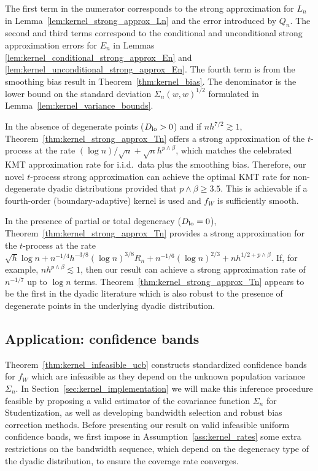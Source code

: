 \documentclass[11pt,lof]{puthesis}
\newcommand{\Dl}{\ensuremath{D_{\textup{lo}}}}
\theoremstyle{break}
\theoremstyle{proof}
\begin{document}
The first term in the numerator corresponds to the strong approximation for
$L_n$ in Lemma~\ref{lem:kernel_strong_approx_Ln} and the error introduced by
$Q_n$.
The second and third terms correspond to the conditional and unconditional
strong approximation errors for $E_n$ in Lemmas
\ref{lem:kernel_conditional_strong_approx_En} and
\ref{lem:kernel_unconditional_strong_approx_En}.
The fourth term is from
the smoothing bias result in Theorem~\ref{thm:kernel_bias}. The denominator is
the lower bound on the standard deviation $\Sigma_n(w,w)^{1/2}$ formulated in
Lemma~\ref{lem:kernel_variance_bounds}.

In the absence of degenerate points ($\Dl > 0$) and if $n h^{7/2}\gtrsim 1$,
Theorem~\ref{thm:kernel_strong_approx_Tn} offers a strong approximation of the
$t$-process at the rate $(\log n)/\sqrt{n}+\sqrt{n}h^{p\wedge\beta}$, which
matches the celebrated KMT approximation rate for i.i.d.\ data plus the
smoothing bias. Therefore, our novel $t$-process strong approximation can
achieve the optimal KMT rate for non-degenerate dyadic distributions provided
that $p\wedge\beta \geq 3.5$. This is achievable if a fourth-order
(boundary-adaptive) kernel is used and $f_W$ is sufficiently smooth.

In the presence of partial or total degeneracy ($\Dl =0$),
Theorem~\ref{thm:kernel_strong_approx_Tn} provides a strong approximation for
the $t$-process at the rate $\sqrt{h}\log n + n^{-1/4}h^{-3/8}(\log n)^{3/8} R_n
+ n^{-1/6}(\log n)^{2/3} + n h^{1/2+p\wedge\beta}$. If, for example, $n
h^{p\wedge\beta}\lesssim 1$, then our result can achieve a strong approximation
rate of $n^{-1/7}$ up to $\log n $ terms.
Theorem~\ref{thm:kernel_strong_approx_Tn} appears to be the first in the dyadic
literature which is also robust to the presence of degenerate points in the
underlying dyadic distribution.

\subsection{Application: confidence bands}

Theorem~\ref{thm:kernel_infeasible_ucb} constructs standardized confidence
bands for
$f_W$ which are infeasible as they depend on the unknown population variance
$\Sigma_n$. In Section~\ref{sec:kernel_implementation} we will make this
inference procedure feasible by proposing a valid estimator of the covariance
function $\Sigma_n$ for Studentization, as well as developing bandwidth
selection and robust bias correction methods. Before presenting our result on
valid infeasible uniform confidence bands, we first impose in
Assumption~\ref{ass:kernel_rates} some extra restrictions on the bandwidth
sequence, which depend on the degeneracy type of the dyadic distribution, to
ensure the coverage rate converges.
\end{document}
